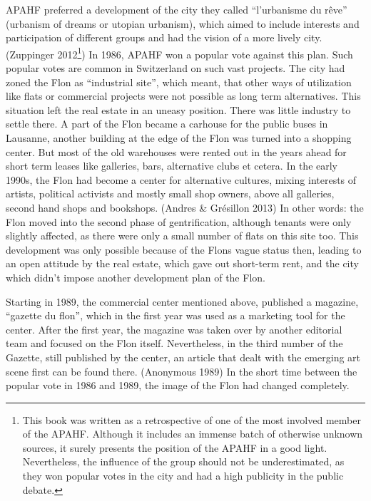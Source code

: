 \documentclass[a4paper,
fontsize=11pt,
oneside,
numbers=noperiodatend,
parskip=half-,
bibliography=totoc,
final
]{scrartcl}
\begin{document}
APAHF preferred a development of the city they called
\enquote{l'urbanisme du rêve} (urbanism of dreams or utopian urbanism),
which aimed to include interests and participation of different groups
and had the vision of a more lively city. (Zuppinger 2012\footnote{This
  book was written as a retrospective of one of the most involved member
  of the APAHF. Although it includes an immense batch of otherwise
  unknown sources, it surely presents the position of the APAHF in a
  good light. Nevertheless, the influence of the group should not be
  underestimated, as they won popular votes in the city and had a high
  publicity in the public debate.}) In 1986, APAHF won a popular vote
against this plan. Such popular votes are common in Switzerland on such
vast projects. The city had zoned the Flon as \enquote{industrial site},
which meant, that other ways of utilization like flats or commercial
projects were not possible as long term alternatives. This situation
left the real estate in an uneasy position. There was little industry to
settle there. A part of the Flon became a carhouse for the public buses
in Lausanne, another building at the edge of the Flon was turned into a
shopping center. But most of the old warehouses were rented out in the
years ahead for short term leases like galleries, bars, alternative
clubs et cetera. In the early 1990s, the Flon had become a center for
alternative cultures, mixing interests of artists, political activists
and mostly small shop owners, above all galleries, second hand shops and
bookshops. (Andres \& Grésillon 2013) In other words: the Flon moved
into the second phase of gentrification, although tenants were only
slightly affected, as there were only a small number of flats on this
site too. This development was only possible because of the Flons vague
status then, leading to an open attitude by the real estate, which gave
out short-term rent, and the city which didn't impose another
development plan of the Flon.

Starting in 1989, the commercial center mentioned above, published a
magazine, \enquote{gazette du flon}, which in the first year was used as
a marketing tool for the center. After the first year, the magazine was
taken over by another editorial team and focused on the Flon itself.
Nevertheless, in the third number of the Gazette, still published by the
center, an article that dealt with the emerging art scene first can be
found there. (Anonymous 1989) In the short time between the popular vote
in 1986 and 1989, the image of the Flon had changed completely.
\end{document}
